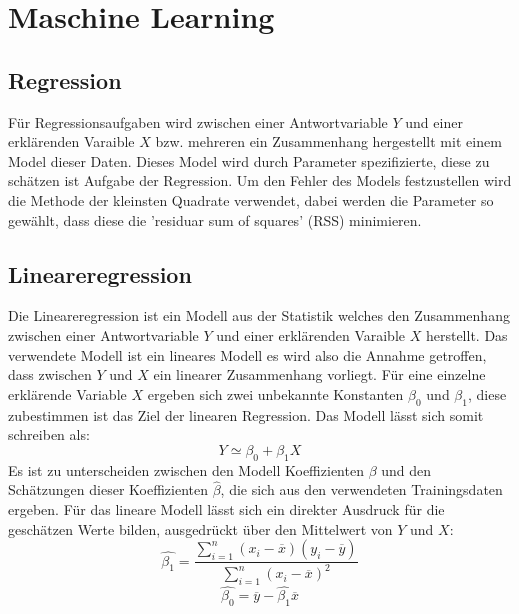 \section{Maschine Learning}
\label{sec:maschinelearning}
\subsection{Regression}
Für Regressionsaufgaben wird zwischen einer Antwortvariable \(Y\) und einer erklärenden Varaible \(X\) bzw. mehreren ein Zusammenhang hergestellt mit einem Model dieser Daten. Dieses Model wird durch Parameter spezifizierte, diese zu schätzen ist Aufgabe der Regression. Um den Fehler des Models festzustellen wird die Methode der kleinsten Quadrate verwendet, dabei werden die Parameter so gewählt, dass diese die 'residuar sum of squares' (RSS) minimieren.
\subsection{Lineareregression}
Die Lineareregression ist ein Modell aus der Statistik welches den Zusammenhang zwischen einer Antwortvariable \(Y\) und einer erklärenden Varaible \(X\) herstellt. Das verwendete Modell ist ein lineares Modell es wird also die Annahme getroffen, dass zwischen \(Y\) und \(X\) ein linearer Zusammenhang vorliegt. Für eine einzelne erklärende Variable \(X\) ergeben sich zwei unbekannte Konstanten \(\beta_0\) und \(\beta_1\), diese zubestimmen ist das Ziel der linearen Regression. Das Modell lässt sich somit schreiben als:
\begin{equation}
    Y \simeq \beta_0 + \beta_1 X
    \label{eq:linreg1}
\end{equation}
Es ist zu unterscheiden zwischen den Modell Koeffizienten \(\beta\) und den Schätzungen dieser Koeffizienten \(\hat{\beta}\), die sich aus den verwendeten Trainingsdaten ergeben. 
Für das lineare Modell lässt sich ein direkter Ausdruck für die geschätzen Werte bilden, ausgedrückt über den Mittelwert von \(Y\) und \(X\):
\begin{equation}
    \hat{\beta_1} = \frac{\sum_{i=1}^{n}(x_i - \overline{x})(y_i - \overline{y})}{\sum_{i=1}^{n}(x_i - \overline{x})^2}
\end{equation}
\begin{equation}
    \hat{\beta_0} = \overline{y} - \hat{\beta_1}\overline{x}
\end{equation}

\cite{james2013}



